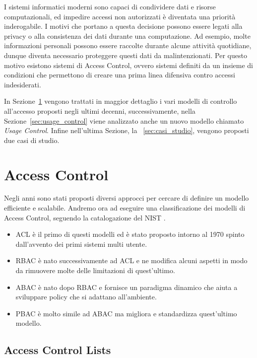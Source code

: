
\label{cap:accessControl}
I sistemi informatici moderni sono capaci di condividere dati e
risorse computazionali, ed impedire accessi non autorizzati è diventata
una priorità inderogabile.
I motivi che portano a questa decisione possono essere legati alla privacy o alla consistenza dei dati durante una computazione.
Ad esempio, molte informazioni personali possono essere
raccolte durante alcune attività quotidiane, dunque diventa necessario
proteggere questi dati da malintenzionati. Per questo motivo esistono sistemi di Access Control, ovvero sistemi
definiti da un insieme di condizioni che permettono di creare una prima
linea difensiva contro accessi indesiderati.


In Sezione~\ref{sec:history} vengono trattati in maggior dettaglio i vari modelli 
di controllo all'accesso proposti negli ultimi decenni, successivamente, nella Sezione~\ref{sec:usage_control} viene analizzato anche un nuovo modello chiamato \textit{Usage Control}. Infine nell'ultima Sezione, la ~\ref{sec:casi_studio}, vengono proposti due casi di studio.
\section{Access Control}
\label{sec:history}



Negli anni sono stati proposti diversi approcci per cercare di definire un
modello efficiente e scalabile. Andremo ora ad eseguire una classificazione
dei modelli di Access Control, seguendo la catalogazione del NIST \cite{NISTACM}.

\begin{itemize}
\item \acf{ACL} è il primo di questi modelli ed è stato proposto intorno al 1970 spinto
dall’avvento dei primi sistemi multi utente.
\item \acf{RBAC} è nato successivamente ad \ac{ACL} e ne modifica alcuni aspetti in modo da rimuovere
molte delle limitazioni di quest'ultimo. 
\item \acf{ABAC} è nato dopo \ac{RBAC} e fornisce un paradigma dinamico che aiuta a sviluppare policy che si adattano all'ambiente. 
\item \acf{PBAC} è molto simile ad \ac{ABAC} ma migliora e standardizza quest'ultimo modello.

\end{itemize}

\subsection*{Access Control Lists}
\label{sub:ACL}

